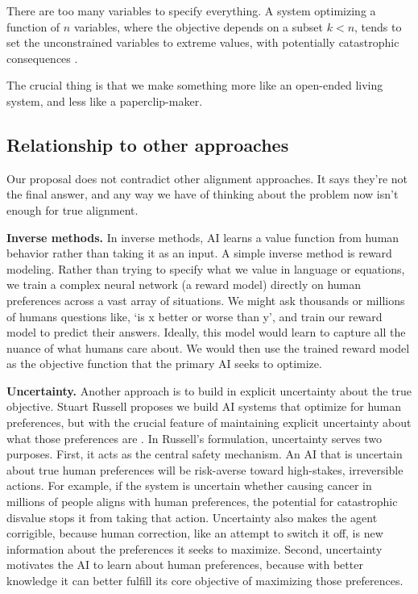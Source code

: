 There are too many variables to specify everything. A system optimizing a function of $n$ variables, where the objective depends on a subset $k<n$, tends to set the unconstrained variables to extreme values, with potentially catastrophic consequences \citep{russell2019human, grossman1986costs, hadfield2019incomplete, zhuang2020consequences}. 

\citep{kerr1975folly}


The crucial thing is that we make something more like an open-ended living system, and less like a paperclip-maker.

\subsection{Relationship to other approaches}
\label{sec:otherapproaches}

Our proposal does not contradict other alignment approaches. It says they're not the final answer, and any way we have of thinking about the problem now isn't enough for true alignment.

\textbf{Inverse methods.} In inverse methods, AI learns a value function from human behavior rather than taking it as an input. A simple inverse method is reward modeling. Rather than trying to specify what we value in language or equations, we train a complex neural network (a reward model) directly on human preferences across a vast array of situations. We might ask thousands or millions of humans questions like, `is x better or worse than y', and train our reward model to predict their answers. Ideally, this model would learn to capture all the nuance of what humans care about. We would then use the trained reward model as the objective function that the primary AI seeks to optimize.

\textbf{Uncertainty.} Another approach is to build in explicit uncertainty about the true objective. Stuart Russell proposes we build AI systems that optimize for human preferences, but with the crucial feature of maintaining explicit uncertainty about what those preferences are \citep{russell2019human, amodei2016concrete, hadfieldmenell2017off, hadfieldmenell2016cooperative}. In Russell's formulation, uncertainty serves two purposes. First, it acts as the central safety mechanism. An AI that is uncertain about true human preferences will be risk-averse toward high-stakes, irreversible actions. For example, if the system is uncertain whether causing cancer in millions of people aligns with human preferences, the potential for catastrophic disvalue stops it from taking that action. Uncertainty also makes the agent corrigible, because human correction, like an attempt to switch it off, is new information about the preferences it seeks to maximize. Second, uncertainty motivates the AI to learn about human preferences, because with better knowledge it can better fulfill its core objective of maximizing those preferences.


